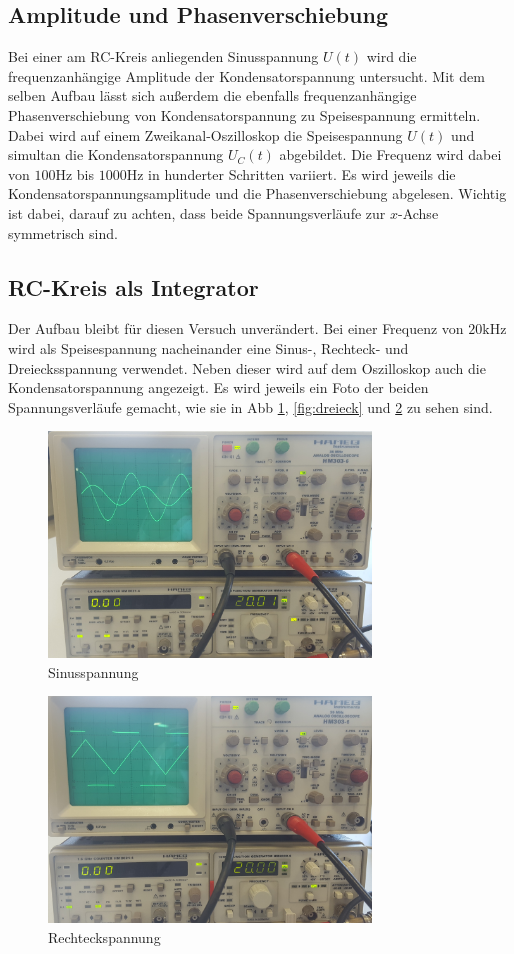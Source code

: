 \subsection{Amplitude und Phasenverschiebung}
Bei einer am RC-Kreis anliegenden Sinusspannung $U(t)$ wird die frequenzanhängige Amplitude der Kondensatorspannung untersucht.
Mit dem selben Aufbau lässt sich außerdem die ebenfalls frequenzanhängige
Phasenverschiebung von Kondensatorspannung zu Speisespannung ermitteln.
Dabei wird auf einem Zweikanal-Oszilloskop die Speisespannung $U(t)$ und simultan die Kondensatorspannung $U_C (t)$ abgebildet.
Die Frequenz wird dabei von $100\si{\hertz}$ bis $1000\si{\hertz}$ in hunderter Schritten variiert. Es wird jeweils die 
Kondensatorspannungsamplitude und die Phasenverschiebung abgelesen. Wichtig ist dabei, darauf zu achten, dass beide Spannungsverläufe
zur $x$-Achse symmetrisch sind. 

\subsection{RC-Kreis als Integrator}
Der Aufbau bleibt für diesen Versuch unverändert.
Bei einer Frequenz von $20\si{\kilo\hertz}$ wird als Speisespannung nacheinander eine Sinus-, Rechteck- und Dreiecksspannung
verwendet. Neben dieser wird auf dem Oszilloskop auch die Kondensatorspannung angezeigt. Es wird jeweils ein Foto der beiden 
Spannungsverläufe gemacht, wie sie in Abb \ref{fig:sinus}, \ref{fig:dreieck} und \ref{fig:rechteck} zu sehen sind. 

\begin{figure}
    \centering
    \includegraphics[height=6cm]{data/d_sinus}
    \caption{Sinusspannung}
    \label{fig:sinus}
\end{figure}

\begin{figure}
    \centering
    \includegraphics[height=6cm]{data/d_rechteck}
    \caption{Rechteckspannung}
    \label{fig:rechteck}
\end{figure}


